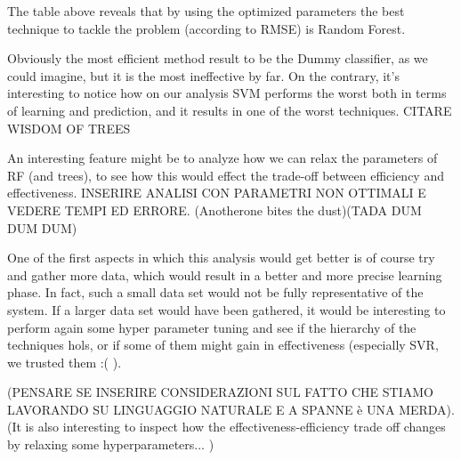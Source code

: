 \documentclass{article}
\begin{document}
The table above reveals that by using the optimized parameters the best technique to tackle the problem (according to RMSE) is Random Forest. 

Obviously the most efficient method result to be the Dummy classifier, as we could imagine, but it is the most ineffective by far.
On the contrary, it's interesting to notice how on our analysis SVM performs the worst both in terms of learning and prediction, and it results in one of the worst techniques.
CITARE WISDOM OF TREES

An interesting feature might be to analyze how we can relax the parameters of RF (and trees), to see how this would effect the trade-off between efficiency and effectiveness.
INSERIRE ANALISI CON PARAMETRI NON OTTIMALI E VEDERE TEMPI ED ERRORE.
(Anotherone bites the dust)(TADA DUM    DUM    DUM)

One of the first aspects in which this analysis would get better is of course try and gather more data, which would result in a better and more precise learning phase. In fact, such a small data set would not be fully representative of the system.
If a larger data set would have been gathered, it would be interesting to perform again some hyper parameter tuning and see if the hierarchy of the techniques hols, or if some of them might gain in effectiveness (especially SVR, we trusted them :( ).

(PENSARE SE INSERIRE CONSIDERAZIONI SUL FATTO CHE STIAMO LAVORANDO SU LINGUAGGIO NATURALE E A SPANNE è UNA MERDA).
(It is also interesting to inspect how the effectiveness-efficiency trade off changes by relaxing some hyperparameters... )
\cite{slides}

\newpage


\end{document}
